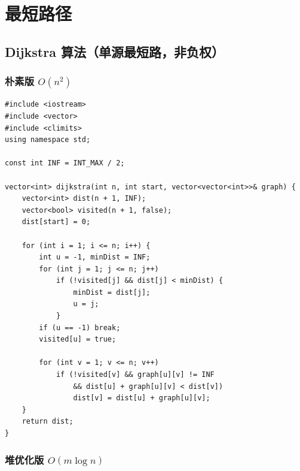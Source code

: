 \documentclass[12pt,a4paper]{article}
\begin{document}
\newpage

\section{最短路径}

\subsection{Dijkstra 算法（单源最短路，非负权）}

\subsubsection{朴素版 $O(n^2)$}

\begin{lstlisting}[caption={Dijkstra 朴素版}]
#include <iostream>
#include <vector>
#include <climits>
using namespace std;

const int INF = INT_MAX / 2;

vector<int> dijkstra(int n, int start, vector<vector<int>>& graph) {
    vector<int> dist(n + 1, INF);
    vector<bool> visited(n + 1, false);
    dist[start] = 0;

    for (int i = 1; i <= n; i++) {
        int u = -1, minDist = INF;
        for (int j = 1; j <= n; j++)
            if (!visited[j] && dist[j] < minDist) {
                minDist = dist[j];
                u = j;
            }
        if (u == -1) break;
        visited[u] = true;

        for (int v = 1; v <= n; v++)
            if (!visited[v] && graph[u][v] != INF
                && dist[u] + graph[u][v] < dist[v])
                dist[v] = dist[u] + graph[u][v];
    }
    return dist;
}
\end{lstlisting}

\subsubsection{堆优化版 $O(m\log n)$}
\end{document}

